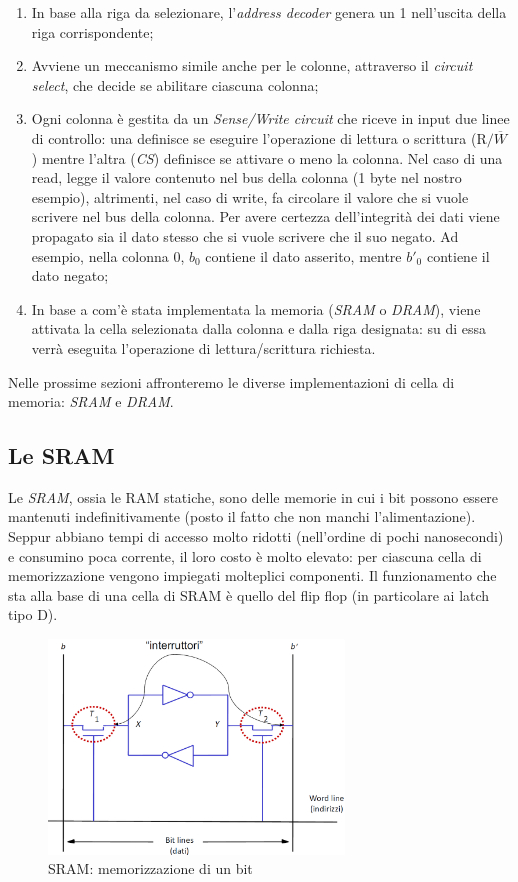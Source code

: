 \documentclass[class=book, crop=false, oneside]{standalone}
\begin{document}
\begin{enumerate}
	\item In base alla riga da selezionare, l'\emph{address decoder} genera un 1 nell'uscita della riga corrispondente;
	\item Avviene un meccanismo simile anche per le colonne, attraverso il \emph{circuit select}, che decide se abilitare ciascuna colonna;
	\item Ogni colonna è gestita da un \emph{Sense/Write circuit} che riceve in input due linee di controllo: una definisce se eseguire l'operazione di lettura o scrittura (\emph{\(\textrm{R/}\overline{W}\)}) mentre l'altra (\emph{CS}) definisce se attivare o meno la colonna. Nel caso di una read, legge il valore contenuto nel bus della colonna (1 byte nel nostro esempio), altrimenti, nel caso di write, fa circolare il valore che si vuole scrivere nel bus della colonna. Per avere certezza dell'integrità dei dati viene propagato sia il dato stesso che si vuole scrivere che il suo negato. Ad esempio, nella colonna 0, \(b_0\) contiene il dato asserito, mentre \(b'_0\) contiene il dato negato;
	\item In base a com'è stata implementata la memoria (\emph{SRAM} o \emph{DRAM}), viene attivata la cella selezionata dalla colonna e dalla riga designata: su di essa verrà eseguita l'operazione di lettura/scrittura richiesta.
\end{enumerate}

Nelle prossime sezioni affronteremo le diverse implementazioni di cella di memoria: \emph{SRAM} e \emph{DRAM}.

\subsection{Le SRAM}
Le \emph{SRAM}, ossia le RAM statiche, sono delle memorie in cui i bit possono essere mantenuti indefinitivamente (posto il fatto che non manchi l'alimentazione). Seppur abbiano tempi di accesso molto ridotti (nell'ordine di pochi nanosecondi) e consumino poca corrente, il loro costo è molto elevato: per ciascuna cella di memorizzazione vengono impiegati molteplici componenti.
Il funzionamento che sta alla base di una cella di SRAM è quello del flip flop (in particolare ai latch tipo D).

\begin{figure}[H]
	\centering
	\includegraphics[width=0.7\textwidth,keepaspectratio]{cella_SRAM.png}
	\caption{SRAM: memorizzazione di un bit}
\end{figure}
\end{document}

